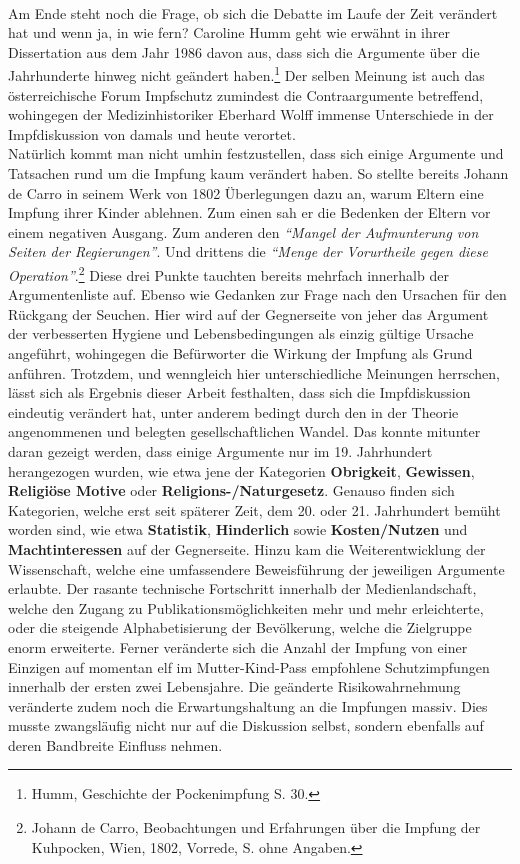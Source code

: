 \documentclass[
    a4paper,
    12pt,
    hyphens,
    chapterprefix=true,
    headheight=33pt,
    footheight=29pt,
    headings=optiontohead, %
]{scrartcl}
\begin{document}
{\\
Am Ende steht noch die Frage, ob sich die Debatte im Laufe der Zeit verändert hat und wenn ja, in wie fern? Caroline Humm geht wie erwähnt in ihrer Dissertation aus dem Jahr 1986 davon aus, dass sich die Argumente über die Jahrhunderte hinweg nicht geändert haben.\footnote{Humm, Geschichte der Pockenimpfung S. 30.} Der selben Meinung ist auch das österreichische Forum Impfschutz zumindest die Contraargumente betreffend, wohingegen der Medizinhistoriker Eberhard Wolff immense Unterschiede in der Impfdiskussion von damals und heute verortet.\\
Natürlich kommt man nicht umhin festzustellen, dass sich einige Argumente und Tatsachen rund um die Impfung kaum verändert haben. So stellte bereits Johann de Carro in seinem Werk von 1802 Überlegungen dazu an, warum Eltern eine Impfung ihrer Kinder ablehnen. Zum einen sah er die Bedenken der Eltern vor einem negativen Ausgang. Zum anderen den \textit{"`Mangel der Aufmunterung von Seiten der Regierungen"'}. Und drittens die \textit{"`Menge der Vorurtheile gegen diese Operation"'}.\footnote{Johann de Carro, Beobachtungen und Erfahrungen über die Impfung der Kuhpocken, Wien, 1802, Vorrede, S. ohne Angaben.} Diese drei Punkte tauchten bereits mehrfach innerhalb der Argumentenliste auf. Ebenso wie Gedanken zur Frage nach den Ursachen für den Rückgang der Seuchen. Hier wird auf der Gegnerseite von jeher das Argument der verbesserten Hygiene und Lebensbedingungen als einzig gültige Ursache angeführt, wohingegen die Befürworter die Wirkung der Impfung als Grund anführen. Trotzdem, und wenngleich hier unterschiedliche Meinungen herrschen, lässt sich als Ergebnis dieser Arbeit festhalten, dass sich die Impfdiskussion eindeutig verändert hat, unter anderem bedingt durch den in der Theorie angenommenen und belegten gesellschaftlichen Wandel. Das konnte mitunter daran gezeigt werden, dass einige Argumente nur im 19. Jahrhundert herangezogen wurden, wie etwa jene der Kategorien \textbf{Obrigkeit}, \textbf{Gewissen}, \textbf{Religiöse Motive} oder \textbf{Religions-/Naturgesetz}. 
Genauso finden sich Kategorien, welche erst seit späterer Zeit, dem 20. oder 21. Jahrhundert bemüht worden sind, wie etwa \textbf{Statistik}, \textbf{Hinderlich} sowie \textbf{Kosten/Nutzen} und \textbf{Machtinteressen} auf der Gegnerseite. Hinzu kam die Weiterentwicklung der Wissenschaft, welche eine umfassendere Beweisführung der jeweiligen Argumente erlaubte. Der rasante technische Fortschritt innerhalb der Medienlandschaft, welche den Zugang zu Publikationsmöglichkeiten mehr und mehr erleichterte, oder die steigende Alphabetisierung der Bevölkerung, welche die Zielgruppe enorm erweiterte. Ferner veränderte sich die Anzahl der Impfung von einer Einzigen auf momentan elf im Mutter-Kind-Pass empfohlene Schutzimpfungen innerhalb der ersten zwei Lebensjahre. Die geänderte Risikowahrnehmung veränderte zudem noch die Erwartungshaltung an die Impfungen massiv. Dies musste zwangsläufig nicht nur auf die Diskussion selbst, sondern ebenfalls auf deren Bandbreite Einfluss nehmen.  


}
\end{document}
